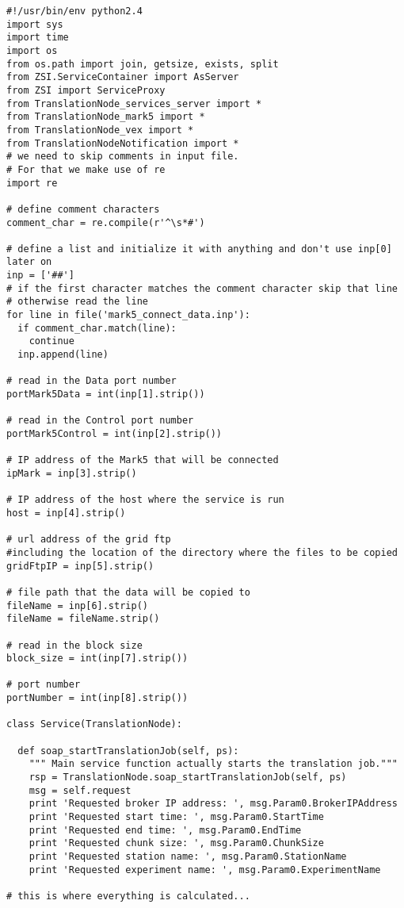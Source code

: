 \begin{verbatim}
#!/usr/bin/env python2.4
import sys
import time
import os
from os.path import join, getsize, exists, split
from ZSI.ServiceContainer import AsServer
from ZSI import ServiceProxy
from TranslationNode_services_server import *
from TranslationNode_mark5 import *
from TranslationNode_vex import *
from TranslationNodeNotification import *
# we need to skip comments in input file.
# For that we make use of re
import re

# define comment characters
comment_char = re.compile(r'^\s*#')

# define a list and initialize it with anything and don't use inp[0] later on 
inp = ['##']
# if the first character matches the comment character skip that line
# otherwise read the line
for line in file('mark5_connect_data.inp'):
  if comment_char.match(line):
    continue
  inp.append(line)

# read in the Data port number
portMark5Data = int(inp[1].strip())

# read in the Control port number
portMark5Control = int(inp[2].strip())

# IP address of the Mark5 that will be connected
ipMark = inp[3].strip()

# IP address of the host where the service is run
host = inp[4].strip()

# url address of the grid ftp 
#including the location of the directory where the files to be copied
gridFtpIP = inp[5].strip()

# file path that the data will be copied to
fileName = inp[6].strip()
fileName = fileName.strip()

# read in the block size
block_size = int(inp[7].strip())

# port number 
portNumber = int(inp[8].strip())

class Service(TranslationNode):

  def soap_startTranslationJob(self, ps):
    """ Main service function actually starts the translation job."""
    rsp = TranslationNode.soap_startTranslationJob(self, ps)
    msg = self.request
    print 'Requested broker IP address: ', msg.Param0.BrokerIPAddress
    print 'Requested start time: ', msg.Param0.StartTime
    print 'Requested end time: ', msg.Param0.EndTime
    print 'Requested chunk size: ', msg.Param0.ChunkSize
    print 'Requested station name: ', msg.Param0.StationName
    print 'Requested experiment name: ', msg.Param0.ExperimentName

# this is where everything is calculated...


\end{verbatim}

